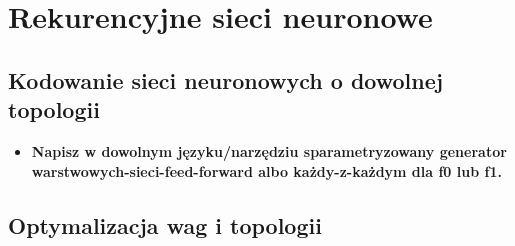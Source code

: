 
\section{Rekurencyjne sieci neuronowe}

\subsection{ Kodowanie sieci neuronowych o dowolnej topologii}

\begin{itemize}
\item \textbf{
Napisz w dowolnym języku/narzędziu sparametryzowany generator warstwowych-sieci-feed-forward albo każdy-z-każdym dla f0 lub f1.}	
\end{itemize}

\subsection{ Optymalizacja wag i topologii }


